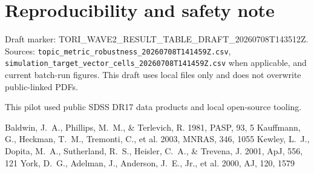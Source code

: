 \documentclass[twocolumn]{aastex631}
\begin{document}
    \section*{Reproducibility and safety note}
    Draft marker: TORI\_WAVE2\_RESULT\_TABLE\_DRAFT\_20260708T143512Z.  Sources: \texttt{topic\_metric\_robustness\_20260708T141459Z.csv}, \texttt{simulation\_target\_vector\_cells\_20260708T141459Z.csv} when applicable, and current batch-run figures.  This draft uses local files only and does not overwrite public-linked PDFs.

    \acknowledgments
    This pilot used public SDSS DR17 data products and local open-source tooling.

    \begin{thebibliography}{}
     Baldwin, J.~A., Phillips, M.~M., \& Terlevich, R. 1981, PASP, 93, 5
     Kauffmann, G., Heckman, T.~M., Tremonti, C., et al. 2003, MNRAS, 346, 1055
     Kewley, L.~J., Dopita, M.~A., Sutherland, R.~S., Heisler, C.~A., \& Trevena, J. 2001, ApJ, 556, 121
     York, D.~G., Adelman, J., Anderson, J.~E., Jr., et al. 2000, AJ, 120, 1579
    \end{thebibliography}

    
\end{document}
